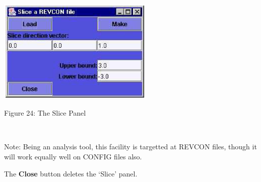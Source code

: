 \begin{enumerate}
~

\vskip 5mm
\centerline{\includegraphics[height=5cm]{slice.ps}}
\centerline{Figure 24: The Slice Panel}
\vskip 5mm

~

\noindent
Note: Being an analysis tool, this facility is targetted at REVCON
files, though it will work equally well on CONFIG files also.

The {\bf Close} button deletes the `Slice' panel.
\end{enumerate}
